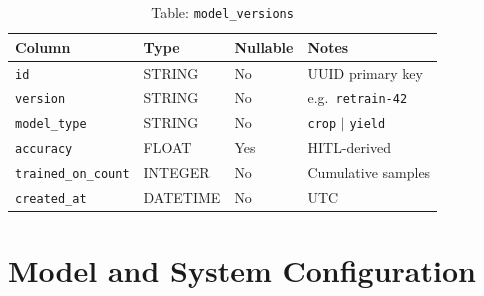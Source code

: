\documentclass[12pt,a4paper,oneside]{report}
\begin{document}
\begin{table}[h]\centering\caption{Table: \texttt{model\_versions}}
\begin{tabular}{llll}\toprule\textbf{Column}&\textbf{Type}&\textbf{Nullable}&\textbf{Notes}\\\midrule
\texttt{id}                &STRING  &No&UUID primary key\\
\texttt{version}           &STRING  &No&e.g.\ \texttt{retrain-42}\\
\texttt{model\_type}       &STRING  &No&\texttt{crop} $|$ \texttt{yield}\\
\texttt{accuracy}          &FLOAT   &Yes&HITL-derived\\
\texttt{trained\_on\_count}&INTEGER &No&Cumulative samples\\
\texttt{created\_at}       &DATETIME&No&UTC\\\bottomrule\end{tabular}\end{table}

\chapter{Model and System Configuration}
\label{app:config}
\end{document}
